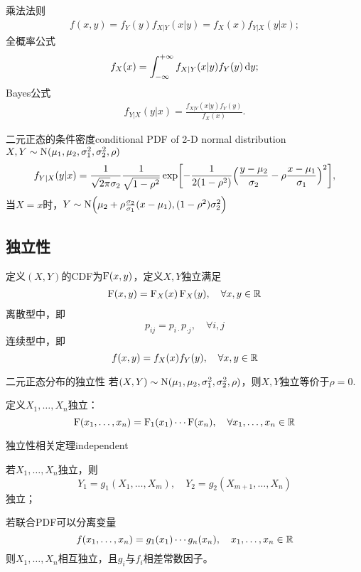 乘法法则
\begin{align}
	f(x,y)=f_Y(y)f_{X|Y}(x|y)=f_X(x)f_{Y|X}(y|x);
\end{align}
全概率公式 
\begin{align}
	f_X(x)=\int_{-\infty}^{+\infty} f_{X|Y}(x|y)f_Y(y)\mathop{}\!\mathrm{d} y;
\end{align}
Bayes公式 
\begin{align}
	f_{Y|X}(y|x)=\frac{f_{X|Y}(x|y)f_Y(y)}{f_X(x)}.
\end{align}
\begin{example}{二元正态的条件密度}{conditional PDF of 2-D normal distribution}
	$X,Y\sim\operatorname{N}(\mu_1,\mu_2,\sigma_1^2,\sigma_2^2,\rho)$
	{\small\begin{align*}
		f_{Y|X}(y|x)=\frac1{\sqrt{2\pi}\sigma_2}\frac1{\sqrt{1-\rho^2}}\exp\biggl[-\frac1{2(1-\rho^2)}\Bigl(\frac{y-\mu_2}{\sigma_2}-\rho\frac{x-\mu_1}{\sigma_1}\Bigr)^2\biggr],
	\end{align*}}
	当$X=x$时，$Y\sim\operatorname{N}\Bigl(\mu_2+\rho\frac{\sigma_2}{\sigma_1}(x-\mu_1),(1-\rho^2)\sigma_2^2\Bigr)$
\end{example}
\subsection{独立性}
定义$(X,Y)$的CDF为$\operatorname{F}(x,y)$，定义$X,Y$独立满足
\begin{align}
	\operatorname{F}(x,y)=\operatorname{F}_X(x)\operatorname{F}_X(y),\quad\forall x,y\in\mathbb R
\end{align}
离散型中，即
\[
	p_{ij}=p_{i\cdot}p_{\cdot j},\quad \forall i,j
\]
连续型中，即
\[
	f(x,y)=f_X(x)f_Y(y),\quad \forall x,y\in\mathbb R
\]
\begin{example}{二元正态分布的独立性}{}
	若$(X,Y)\sim\operatorname{N}(\mu_1,\mu_2,\sigma_1^2,\sigma_2^2,\rho)$，则$X,Y$独立等价于$\rho=0.$
\end{example}

定义$X_1,\ldots,X_n$独立： 
\[
	\operatorname{F}(x_1,\ldots,x_n)=\operatorname{F}_1(x_1)\cdots\operatorname{F}(x_n),\quad\forall x_1,\ldots,x_n\in\mathbb R
\]
\begin{theorem}{独立性相关定理}{independent}
	\begin{compactenum}
		\item 若$X_1,\ldots,X_n$独立，则
		\[
			Y_1=g_1(X_1,\ldots,X_m),\quad Y_2=g_2(X_{m+1},\ldots,X_n)
		\]
		独立；
		\item 若联合PDF可以分离变量
		\[
			f(x_1,\ldots,x_n)=g_1(x_1)\cdots g_n(x_n),\quad x_1,\ldots,x_n\in\mathbb R
		\]
		则$X_1,\ldots,X_n$相互独立，且$g_i$与$f_i$相差常数因子。
	\end{compactenum}
\end{theorem}
